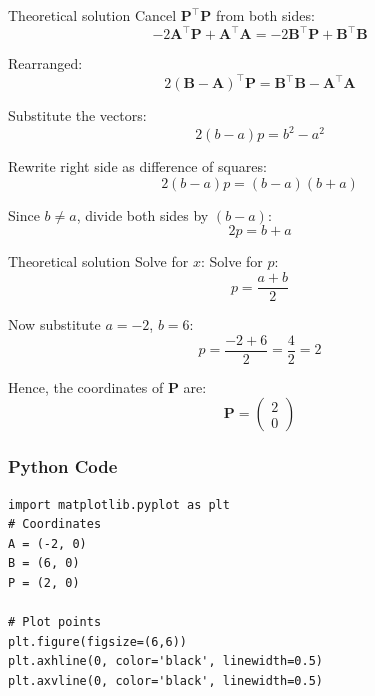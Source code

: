 \documentclass{beamer}
\begin{document}
\begin{frame}{Theoretical solution}
Cancel \(\mathbf{P}^\top \mathbf{P}\) from both sides:
\begin{equation}
- 2 \mathbf{A}^\top \mathbf{P} + \mathbf{A}^\top \mathbf{A} = - 2 \mathbf{B}^\top \mathbf{P} + \mathbf{B}^\top \mathbf{B}
\end{equation}

Rearranged:
\begin{equation}
2 (\mathbf{B} - \mathbf{A})^\top \mathbf{P} = \mathbf{B}^\top \mathbf{B} - \mathbf{A}^\top \mathbf{A}
\end{equation}

Substitute the vectors:
\begin{equation}
2 (b - a) p = b^2 - a^2
\end{equation}

Rewrite right side as difference of squares:
\begin{equation}
2 (b - a) p = (b - a)(b + a)
\end{equation}

Since \(b \neq a\), divide both sides by \((b - a)\):
\begin{equation}
2 p = b + a
\end{equation}
\end{frame}

\begin{frame}{Theoretical solution}
Solve for \(x\):
Solve for \(p\):
\begin{equation}
p = \frac{a + b}{2}
\end{equation}

Now substitute \(a = -2\), \(b = 6\):
\begin{equation}
p = \frac{-2 + 6}{2} = \frac{4}{2} = 2
\end{equation}

Hence, the coordinates of \(\mathbf{P}\) are:
\begin{equation}
\boxed{
\mathbf{P} = \begin{pmatrix} 2 \\ 0 \end{pmatrix}
}
\end{equation}
\end{frame}

\begin{frame}[fragile]
    \frametitle{Python Code}
    \begin{lstlisting}
import matplotlib.pyplot as plt
# Coordinates
A = (-2, 0)
B = (6, 0)
P = (2, 0)

# Plot points
plt.figure(figsize=(6,6))
plt.axhline(0, color='black', linewidth=0.5)
plt.axvline(0, color='black', linewidth=0.5)
\end{lstlisting}
\end{frame}
\end{document}
